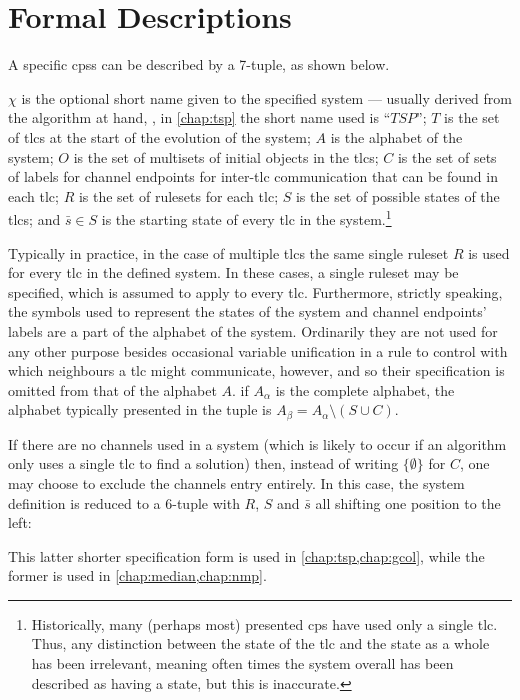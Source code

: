 \section{\label{sec:cps:formaldescriptions}Formal  Descriptions}

A specific \glspl{cps} can be described by a 7-tuple, as shown below.

\cptuplechanstemplate{}

\(\chi\) is the optional short name given to the specified system --- usually derived from the algorithm at hand, \eg{}, in \cref{chap:tsp} the short name used is \enquote{\(\mathit{TSP}\)};  \(T\) is the set of \glspl{tlc} at the start of the evolution of the system; \(A\) is the alphabet of the system; \(O\) is the set of multisets of initial objects in the \glspl{tlc};  \(C\) is the set of sets of labels for channel endpoints for inter-\gls{tlc} communication that can be found in each \gls{tlc};  \(R\) is the set of \glspl{ruleset} for each \gls{tlc}; \(S\) is the set of possible states of the \glspl{tlc}; and \(\bar{s} \in S\) is the starting state of every \gls{tlc} in the system.\footnote{Historically, many (perhaps most) presented \gls{cps} have used only a single \gls{tlc}.  Thus, any distinction between the state of the \gls{tlc} and the state as a whole has been irrelevant, meaning often times the system overall has been described as having a state, but this is inaccurate.}

Typically in practice, in the case of multiple \glspl{tlc} the same single ruleset \(R\) is used for every \gls{tlc} in the defined system.  In these cases, a single ruleset may be specified, which is assumed to apply to every \gls{tlc}.  Furthermore, strictly speaking, the symbols used to represent the states of the system and channel endpoints' labels are a part of the alphabet of the system.  Ordinarily they are not used for any other purpose besides occasional variable unification in a rule to control with which neighbours a \gls{tlc} might communicate, however, and so their specification is omitted from that of the alphabet \(A\).  \Ie{} if \(A_\alpha\) is the complete alphabet, the alphabet typically presented in the tuple is \( A_\beta = A_\alpha \setminus (S \cup C) \).

If there are no channels used in a system (which is likely to occur if an algorithm only uses a single \gls{tlc} to find a solution) then, instead of writing \(\{\emptyset\}\) for \(C\), one may choose to exclude the channels entry entirely.  In this case, the system definition is reduced to a 6-tuple with \(R\), \(S\) and \(\bar{s}\) all shifting one position to the left:

\cptupletemplate{}

This latter shorter specification form is used in \cref{chap:tsp,chap:gcol}, while the former is used in \cref{chap:median,chap:nmp}.